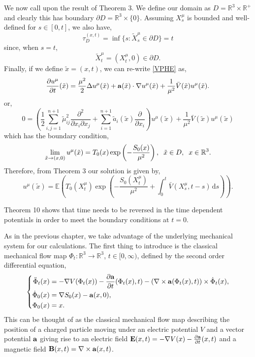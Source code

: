 \documentclass[a4paper,12pt,draft]{report}
\theoremstyle{remark}
\theoremstyle{definition}
\begin{document}
{$$$$
We now call upon the result of Theorem 3.  We define our domain as $D = \mathbb{R}^3 \times \mathbb{R}^+$ and clearly this has boundary $\partial D = \mathbb{R}^3 \times \{0\}$.  Assuming $X_s^\mu$ is bounded and well-defined for $s \in [0, t]$, we also have,
$$
\tau_D^{(x, t)} = \inf\{s : \tilde{X}_s^\mu \in \partial D\} = t
$$
since, when $s = t$,
$$
\tilde{X}_t^\mu = (X_t^\mu, 0) \in \partial D.
$$
Finally, if we define $\tilde{x} = (x, t)$, we can re-write \eqref{VPHE} as,
$$
\frac{\partial u^\mu}{\partial t}(\tilde{x}) = \frac{\mu^2}{2}\Delta u^\mu(\tilde{x}) + \bold{a}(\tilde{x})\cdot\nabla u^\mu(\tilde{x}) + \frac{1}{\mu^2}\bar{V}(\tilde{x})u^\mu(\tilde{x}).
$$
or,
$$
0 = \left(\frac{1}{2}\sum_{i, j = 1}^{n + 1}\tilde{\mu}_{ij}^2\frac{\partial^2}{\partial x_i \partial x_j} + \sum_{i = 1}^{n + 1}\tilde{a}_i(\tilde{x})\frac{\partial}{\partial x_i}\right)u^\mu(\tilde{x}) + \frac{1}{\mu^2}\bar{V}(\tilde{x})u^\mu(\tilde{x})
$$
which has the boundary condition,
$$
\lim_{\tilde{x} \to (x, 0)} u^\mu(\tilde{x}) = T_0(x)\exp\left(-\frac{S_0(x)}{\mu^2}\right), \hspace{0.2cm} \tilde{x} \in D, \hspace{0.2cm} x \in \mathbb{R}^3.
$$
Therefore, from Theorem 3 our solution is given by,
$$
u^\mu(\tilde{x}) = \mathbb{E}\left(T_0(X_t^\mu)\exp\left(-\frac{S_0(X_t^\mu)}{\mu^2} + \int_0^t\bar{V}(X_s^\mu, t - s)\,\mathrm{d}s\right)\right).\nonumber
$$

\qedhere
}

Theorem 10 shows that time needs to be reversed in the time dependent potentials in order to meet the boundary conditions at $t = 0$.

As in the previous chapter, we take advantage of the underlying mechanical system for our calculations.  The first thing to introduce is the classical mechanical flow map $\Phi_t : \mathbb{R}^3 \to \mathbb{R}^3$, $t \in [0, \infty)$, defined by the second order differential equation,
\begin{equation}
\left\{
\begin{aligned}
\ddot{\Phi}_t(x) & = -\nabla V(\Phi_t(x)) - \frac{\partial \bold{a}}{\partial t}(\Phi_t(x), t) - (\nabla \times \bold{a}(\Phi_t(x), t))\times\dot{\Phi}_t(x),\\ \label{CMFM2}
\dot{\Phi}_0(x) & = \nabla S_0(x) - \bold{a}(x, 0),\\
\Phi_0(x) & = x.
\end{aligned}
\right.
\end{equation}
This can be thought of as the classical mechanical flow map describing the position of a charged particle moving under an electric potential $V$ and a vector potential $\bold{a}$ giving rise to an electric field $\bold{E}(x, t) = -\nabla V(x) - \frac{\partial \bold{a}}{\partial t}(x, t)$ and a magnetic field $\bold{B}(x, t) = \nabla \times \bold{a}(x, t)$.
\end{document}
